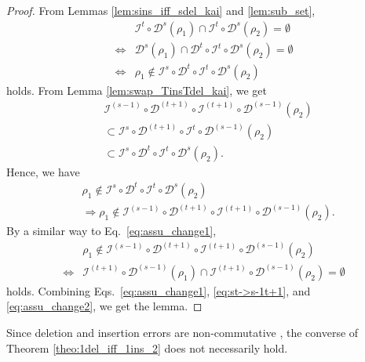 \documentclass[reprint,amsmath,amssymb,aps,]{revtex4-2}
\theoremstyle{definition}
\newcommand{\1}{\mbox{1}\hspace{-0.25em}\mbox{l}}%
\newcommand{\QU}[1]{\mathcal{#1}}
\begin{document}
\begin{proof}
  From Lemmas \ref{lem:sins_iff_sdel_kai} and \ref{lem:sub_set},
  \begin{align}
    &\QU{I}^{t} \circ \QU{D}^{s}(\rho_1)  \cap \QU{I}^{t} \circ \QU{D}^{s}(\rho_2)
    =
    \emptyset
    \nonumber\\
    \iff&
    \QU{D}^{s}(\rho_1)  \cap \QU{D}^{t} \circ \QU{I}^{t} \circ \QU{D}^{s}(\rho_2)
    =
    \emptyset
    \nonumber\\
    \iff&
    \rho_1
    \notin
    \QU{I}^{s} \circ \QU{D}^{t} \circ \QU{I}^{t} \circ \QU{D}^{s}(\rho_2)
    \label{eq:assu_change1}
  \end{align}
  holds.
  From Lemma \ref{lem:swap_TinsTdel_kai},
  we get
  \begin{align*}
    &\QU{I}^{(s-1)}\circ \QU{D}^{(t+1)} \circ \QU{I}^{(t+1)} \circ \QU{D}^{(s-1)}(\rho_2)\\
    &\subset
    \QU{I}^{s} \circ \QU{D}^{(t+1)} \circ \QU{I}^{t} \circ \QU{D}^{(s-1)}(\rho_2)\\
    &\subset 
    \QU{I}^{s} \circ \QU{D}^{t} \circ \QU{I}^{t} \circ \QU{D}^{s}(\rho_2).
  \end{align*}
  Hence,
  we have
  \begin{align}
    &\rho_1 \notin \QU{I}^{s} \circ \QU{D}^{t} \circ \QU{I}^{t} \circ \QU{D}^{s}(\rho_2)
    \nonumber\\
    &\Rightarrow
    \rho_1 \notin \QU{I}^{(s-1)}\circ \QU{D}^{(t+1)} \circ \QU{I}^{(t+1)} \circ \QU{D}^{(s-1)}(\rho_2).
    \label{eq:st->s-1t+1}
  \end{align}
  By a similar way to Eq.~\eqref{eq:assu_change1},
  \begin{align}
    &\rho_1
    \notin
    \QU{I}^{(s-1)} \circ \QU{D}^{(t+1)} \circ \QU{I}^{(t+1)} \circ \QU{D}^{(s-1)}(\rho_2)
    \nonumber\\
    \iff
    &\QU{I}^{(t+1)} \circ \QU{D}^{(s-1)}(\rho_1)
    \cap
    \QU{I}^{(t+1)} \circ \QU{D}^{(s-1)}(\rho_2)
    =
    \emptyset
    \label{eq:assu_change2}
  \end{align}
  holds.
  Combining
  Eqs.~\eqref{eq:assu_change1}, \eqref{eq:st->s-1t+1}, and \eqref{eq:assu_change2},
  we get the lemma.
\end{proof}

Since deletion and insertion errors are non-commutative \cite{hagiwara2024introduction},
the converse of Theorem \ref{theo:1del_iff_1ins_2} does not necessarily hold.
\end{document}
